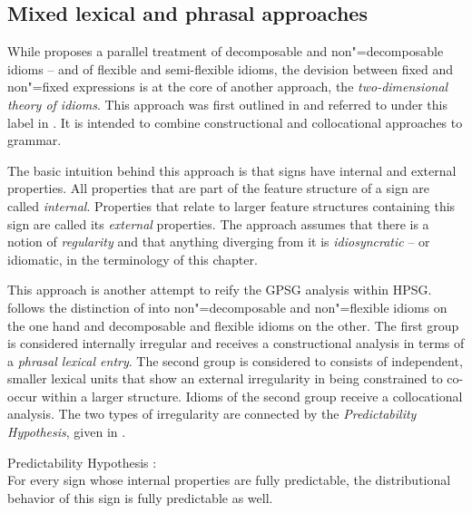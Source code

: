 \documentclass[output=paper]{langsci/langscibook}
\begin{document}

\subsection{Mixed lexical and phrasal approaches}
\label{Sec-Mixed}

While \cite{Riehemann2001a} proposes a parallel treatment of decomposable and non"=decomposable idioms -- and of flexible and semi-flexible idioms, the devision between fixed and non"=fixed expressions is at the core of another approach, the \emph{two-dimensional theory of idioms}. This approach was first outlined in \cite{Sailer2000a} and referred to under this label in \cite{Richter:Sailer:09,Richter:Sailer:14}. It is intended to combine constructional and collocational approaches to grammar.

The basic intuition behind this approach is that signs have internal and external properties. 
All properties that are part of the feature structure of a sign are called \emph{internal}. 
Properties that relate to larger feature structures containing this sign are called its \emph{external} properties. 
The approach assumes that there is a notion of \emph{regularity} and that anything diverging from it is \emph{idiosyncratic} -- or idiomatic, in the terminology of this chapter. 

This approach is another attempt to reify the GPSG analysis within HPSG.
\cite{Sailer2000a} follows the distinction of \cite{NSW94a} into non"=decomposable and non"=flexible idioms on the one hand and decomposable and flexible idioms on the other. The first group is considered internally irregular and receives a constructional analysis in terms of a \emph{phrasal lexical entry}. The second group is considered to consists of independent, smaller lexical units that show an external irregularity in being constrained to co-occur within a larger structure. 
Idioms of the second group receive a collocational analysis. The two types of irregularity are connected by the  \emph{Predictability Hypothesis}, given in .

\ea Predictability Hypothesis \citep[]{Sailer2000a}:\label{PredHypo}\\
For every sign whose internal properties are fully predictable, the distributional
behavior of this sign is fully predictable as well.
\z 
\end{document}

